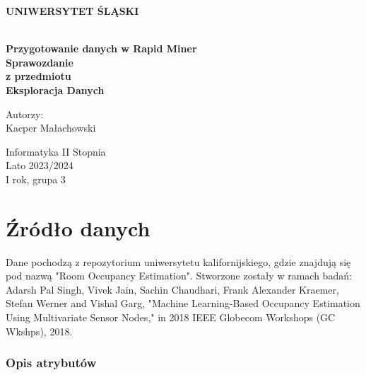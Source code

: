 \documentclass[12pt,oneside,a4paper]{book} %
\theoremstyle{break}
\begin{document}
\thispagestyle{empty}
\begin{center}
  \Large
  \bf{UNIWERSYTET ŚLĄSKI}\\
  \bf{}\\[25mm]
  \large

  \bf{Przygotowanie danych w Rapid Miner}\\[35mm]

  Sprawozdanie\\
  z przedmiotu\\
  Eksploracja Danych\\[25mm]
\end{center}
\begin{flushright}
  \large
  Autorzy:\\
  Kacper Małachowski\\
\end{flushright}
\vspace*{\fill}
\begin{center}
  Informatyka II Stopnia\\
  Lato 2023/2024\\
  I rok, grupa 3\\[25mm]
\end{center}

\chapter*{Źródło danych}

Dane pochodzą z repozytorium uniwersytetu kalifornijskiego, gdzie znajdują się pod nazwą "Room Occupancy Estimation".
Stworzone zostały w ramach badań: Adarsh Pal Singh, Vivek Jain, Sachin Chaudhari, Frank Alexander Kraemer, Stefan Werner and Vishal Garg, "Machine Learning-Based Occupancy Estimation Using Multivariate Sensor Nodes," in 2018 IEEE Globecom Workshops (GC Wkshps), 2018.

\subsection*{Opis atrybutów}
\end{document}
